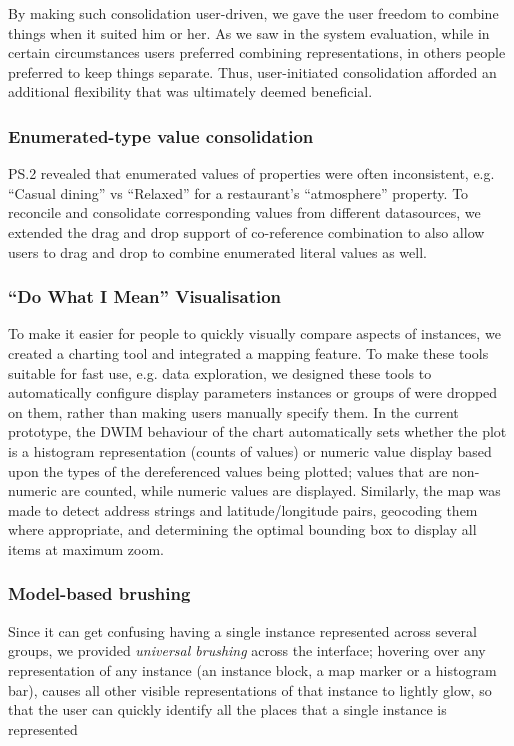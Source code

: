 \documentclass{sigchi}
\begin{document}
By making such consolidation user-driven, we gave the user freedom to combine things when it suited him or her. As we saw in the system evaluation, while in certain circumstances users preferred combining representations, in others people preferred to keep things separate.  Thus, user-initiated consolidation afforded an additional flexibility that was ultimately deemed beneficial.

\subsubsection{Enumerated-type value consolidation}
PS.2 revealed that enumerated values of properties were often inconsistent, e.g. ``Casual dining'' vs ``Relaxed'' for a restaurant's ``atmosphere'' property. To reconcile and consolidate corresponding values from different  datasources, we extended the drag and drop support of co-reference combination to also allow users to drag and drop to combine enumerated literal values as well.  

\subsubsection{``Do What I Mean'' Visualisation}

To make it easier for people to quickly visually compare aspects of instances, we created a charting tool and integrated a mapping feature.  To make these tools suitable for fast use, e.g. data exploration, we designed these tools to automatically configure display parameters instances or groups of were dropped on them, rather than making users manually specify them. In the current prototype, the DWIM behaviour of the chart automatically sets whether the plot is a histogram representation (counts of values) or numeric value display based upon the types of the dereferenced values being plotted; values that are non-numeric are counted, while numeric values are displayed.    Similarly, the map was made to detect address strings and latitude/longitude pairs, geocoding them where appropriate, and determining the optimal bounding box to display all items at maximum zoom.

\subsubsection{Model-based brushing}
Since it can get confusing having a single instance represented across several groups, we provided \emph{universal brushing} across the interface; hovering over any representation of any instance (an instance block, a map marker or a histogram bar), causes all other visible representations of that instance to lightly glow, so that the user can quickly identify all the places that a single instance is represented
\end{document}
